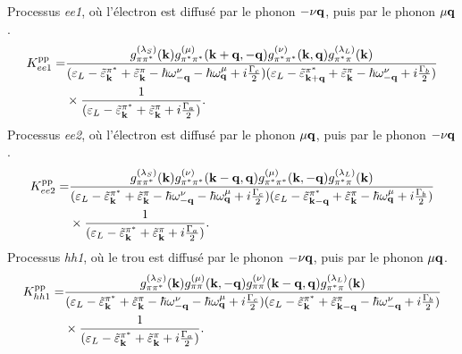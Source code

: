 \noindent
Processus \textit{ee1}, où l'électron est diffusé par le phonon $-\nu\mathbf{q}$, puis par le phonon $\mu\mathbf{q}$.
\begin{equation}
    \begin{split}
    K_{ee1}^{\text{pp}} = &\frac{g^{(\lambda_S)}_{\pi\pi^*}(\mathbf{k})g^{(\mu)}_{\pi^*\pi^*}(\mathbf{k}+\mathbf{q},-\mathbf{q})g_{\pi^*\pi^*}^{(\nu)}(\mathbf{k},\mathbf{q})g_{\pi^*\pi}^{(\lambda_L)}(\mathbf{k})}{(\varepsilon_L-\tilde{\varepsilon}_{\mathbf{k}}^{\pi^*}+\tilde{\varepsilon}_{\mathbf{k}}^\pi-\hbar\omega_{-\mathbf{q}}^\nu-\hbar\omega_{\mathbf{q}}^\mu+i\frac{\Gamma_c}{2})(\varepsilon_L-\tilde{\varepsilon}_{\mathbf{k}+\mathbf{q}}^{\pi^*}+\tilde{\varepsilon}_{\mathbf{k}}^\pi-\hbar\omega_{-\mathbf{q}}^\nu+i\frac{\Gamma_b}{2})}\\
    &\times\frac{1}{(\varepsilon_L-\tilde{\varepsilon}_{\mathbf{k}}^{\pi^*}+\tilde{\varepsilon}_{\mathbf{k}}^\pi+i\frac{\Gamma_a}{2})}.\label{eqn:pp_ee1}
    \end{split}
\end{equation}
Processus \textit{ee2}, où l'électron est diffusé par le phonon $\mu\mathbf{q}$, puis par le phonon $-\nu\mathbf{q}$.
\begin{equation}
    \begin{split}
    K_{ee2}^{\text{pp}} = &\frac{g^{(\lambda_S)}_{\pi\pi^*}(\mathbf{k})g^{(\nu)}_{\pi^*\pi^*}(\mathbf{k}-\mathbf{q},\mathbf{q})g_{\pi^*\pi^*}^{(\mu)}(\mathbf{k},-\mathbf{q})g_{\pi^*\pi}^{(\lambda_L)}(\mathbf{k})}{(\varepsilon_L-\tilde{\varepsilon}_{\mathbf{k}}^{\pi^*}+\tilde{\varepsilon}_{\mathbf{k}}^\pi-\hbar\omega_{-\mathbf{q}}^\nu-\hbar\omega_{\mathbf{q}}^\mu+i\frac{\Gamma_c}{2})(\varepsilon_L-\tilde{\varepsilon}_{\mathbf{k}-\mathbf{q}}^{\pi^*}+\tilde{\varepsilon}_{\mathbf{k}}^\pi-\hbar\omega_{\mathbf{q}}^\mu+i\frac{\Gamma_b}{2})}\\
    &\times\frac{1}{(\varepsilon_L-\tilde{\varepsilon}_{\mathbf{k}}^{\pi^*}+\tilde{\varepsilon}_{\mathbf{k}}^\pi+i\frac{\Gamma_a}{2})}.\label{eqn:pp_ee2}
    \end{split}
\end{equation}
Processus \textit{hh1}, où le trou est diffusé par le phonon $-\nu\mathbf{q}$, puis par le phonon $\mu\mathbf{q}$.
\begin{equation}
    \begin{split}
    K_{hh1}^{\text{pp}} = &\frac{g^{(\lambda_S)}_{\pi\pi^*}(\mathbf{k})g^{(\mu)}_{\pi\pi}(\mathbf{k},-\mathbf{q})g_{\pi\pi}^{(\nu)}(\mathbf{k}-\mathbf{q},\mathbf{q})g_{\pi^*\pi}^{(\lambda_L)}(\mathbf{k})}{(\varepsilon_L-\tilde{\varepsilon}_{\mathbf{k}}^{\pi^*}+\tilde{\varepsilon}_{\mathbf{k}}^\pi-\hbar\omega_{-\mathbf{q}}^\nu-\hbar\omega_{\mathbf{q}}^\mu+i\frac{\Gamma_c}{2})(\varepsilon_L-\tilde{\varepsilon}_{\mathbf{k}}^{\pi^*}+\tilde{\varepsilon}_{\mathbf{k}-\mathbf{q}}^\pi-\hbar\omega_{-\mathbf{q}}^\nu+i\frac{\Gamma_b}{2})}\\
    &\times\frac{1}{(\varepsilon_L-\tilde{\varepsilon}_{\mathbf{k}}^{\pi^*}+\tilde{\varepsilon}_{\mathbf{k}}^\pi+i\frac{\Gamma_a}{2})}.\label{eqn:pp_hh1}
    \end{split}
\end{equation}
